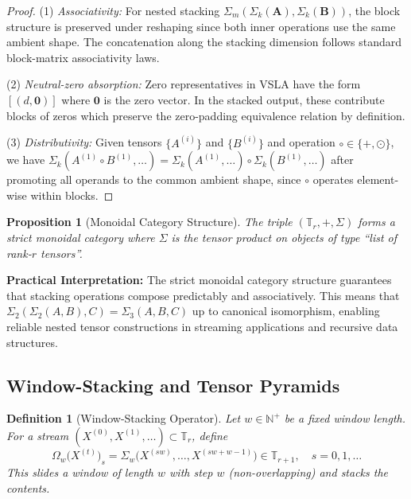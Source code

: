 \documentclass[11pt]{article}
\newtheorem{proposition}[theorem]{Proposition}
\newtheorem{definition}[theorem]{Definition}
\begin{document}
\begin{proof}
(1) \emph{Associativity:} For nested stacking $\Sigma_m(\Sigma_k(\mathbf{A}), \Sigma_k(\mathbf{B}))$, the block structure is preserved under reshaping since both inner operations use the same ambient shape. The concatenation along the stacking dimension follows standard block-matrix associativity laws.

(2) \emph{Neutral-zero absorption:} Zero representatives in VSLA have the form $[(d, \mathbf{0})]$ where $\mathbf{0}$ is the zero vector. In the stacked output, these contribute blocks of zeros which preserve the zero-padding equivalence relation by definition.

(3) \emph{Distributivity:} Given tensors $\{A^{(i)}\}$ and $\{B^{(i)}\}$ and operation $\circ \in \{+, \odot\}$, we have $\Sigma_k(A^{(1)} \circ B^{(1)}, \ldots) = \Sigma_k(A^{(1)}, \ldots) \circ \Sigma_k(B^{(1)}, \ldots)$ after promoting all operands to the common ambient shape, since $\circ$ operates element-wise within blocks.
\end{proof}

\begin{proposition}[Monoidal Category Structure]
The triple $(\mathbb{T}_r, +, \Sigma)$ forms a \emph{strict monoidal category} where $\Sigma$ is the tensor product on objects of type ``list of rank-$r$ tensors''.
\end{proposition}

\textbf{Practical Interpretation:} The strict monoidal category structure guarantees that stacking operations compose predictably and associatively. This means that $\Sigma_2(\Sigma_2(A,B),C) = \Sigma_3(A,B,C)$ up to canonical isomorphism, enabling reliable nested tensor constructions in streaming applications and recursive data structures.

\subsection{Window-Stacking and Tensor Pyramids}

\begin{definition}[Window-Stacking Operator]
Let $w \in \mathbb{N}^+$ be a fixed \emph{window length}. For a stream $(X^{(0)}, X^{(1)}, \ldots) \subset \mathbb{T}_r$, define
\[
\Omega_w\bigl(X^{(t)}\bigr)_s = \Sigma_w\bigl(X^{(sw)}, \ldots, X^{(sw+w-1)}\bigr) \in \mathbb{T}_{r+1}, \quad s = 0, 1, \ldots
\]
This slides a window of length $w$ with step $w$ (non-overlapping) and stacks the contents.
\end{definition}
\end{document}
